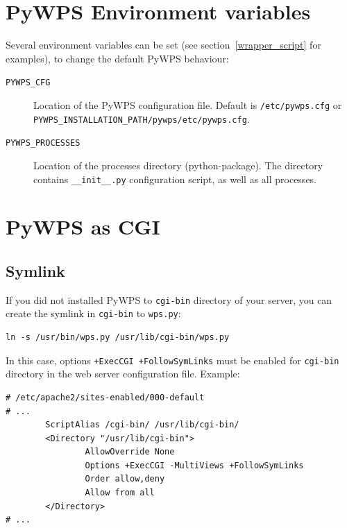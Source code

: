 \documentclass[a4paper,11pt]{report}
\begin{document}
\section{PyWPS Environment variables}
\label{environment_variables}
Several environment variables can be set (see section~\ref{wrapper_script}
for examples), to change the default PyWPS behaviour:
\begin{description}
    \item[\texttt{PYWPS\_CFG}] Location of the PyWPS configuration file.
    Default is \texttt{/etc/pywps.cfg} or
    \texttt{PYWPS\_INSTALLATION\_PATH/pywps/etc/pywps.cfg}.

    \item[\texttt{PYWPS\_PROCESSES}] Location of the processes directory
    (python-package). The directory contains \texttt{\_\_init\_\_.py}
    configuration script, as well as all processes.
\end{description}

\section{PyWPS as CGI}
\subsection{Symlink}
If you did not installed PyWPS to \texttt{cgi-bin} directory of your
server, you can create the symlink in \texttt{cgi-bin} to \texttt{wps.py}:
\begin{verbatim}
ln -s /usr/bin/wps.py /usr/lib/cgi-bin/wps.py
\end{verbatim}
In this case, options \texttt{+ExecCGI +FollowSymLinks} must be enabled for
\texttt{cgi-bin} directory in the web server configuration file. Example:
\begin{verbatim}
# /etc/apache2/sites-enabled/000-default
# ...
        ScriptAlias /cgi-bin/ /usr/lib/cgi-bin/
        <Directory "/usr/lib/cgi-bin">
                AllowOverride None
                Options +ExecCGI -MultiViews +FollowSymLinks
                Order allow,deny
                Allow from all
        </Directory>
# ...
\end{verbatim}
\end{document}
